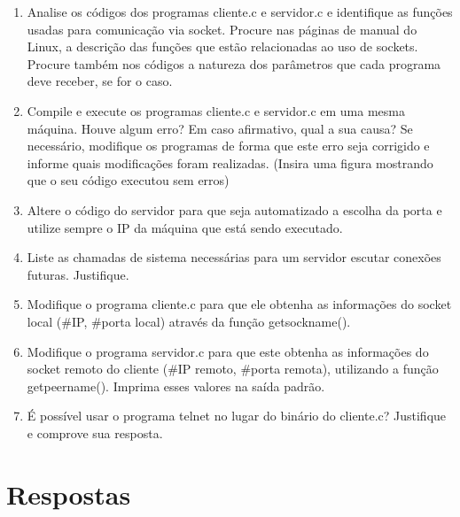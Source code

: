 \documentclass[12pt,a4paper]{report}
\begin{document}
\begin{enumerate}
    \item Analise os códigos dos programas cliente.c e servidor.c e identifique as funções usadas para comunicação via socket. Procure nas páginas de manual do Linux, a descrição das funções que estão relacionadas ao uso de sockets. Procure também nos códigos a natureza dos parâmetros que cada programa deve receber, se for o caso.
    
    \item Compile e execute os programas cliente.c e servidor.c em uma mesma máquina. Houve algum erro? Em caso afirmativo, qual a sua causa? Se necessário, modifique os programas de forma que este erro seja corrigido e informe quais modificações foram realizadas. (Insira uma figura mostrando que o seu código executou sem erros)
    
    \item Altere o código do servidor para que seja automatizado a escolha da porta e utilize sempre o IP da máquina que está sendo executado.
    
    \item Liste as chamadas de sistema necessárias para um servidor escutar conexões futuras. Justifique.
    
    \item Modifique o programa cliente.c para que ele obtenha as informações do socket local (\#IP, \#porta local) através da função getsockname().
    
    \item Modifique o programa servidor.c para que este obtenha as informações do socket remoto do cliente (\#IP remoto, \#porta remota), utilizando a função getpeername(). Imprima esses valores na saída padrão.
    
    \item É possível usar o programa telnet no lugar do binário do cliente.c? Justifique e comprove sua resposta.
\end{enumerate}

\section{Respostas}
\end{document}
